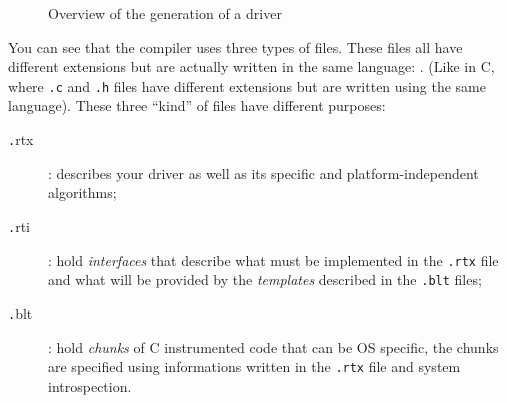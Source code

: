 \documentclass[american]{rtxarticle}
\begin{document}
\begin{figure}[ht!]
\begin{center}
\caption{Overview of the generation of a driver}
\end{center}
\end{figure}

You can see that the compiler uses three types of files. These files all have
different extensions but are actually written in the same language: \rtx. (Like
in C, where \texttt{.c} and \texttt{.h} files have different extensions but are
written using the same language). These three ``kind'' of files have different
purposes:
\begin{description}
\item [{\texttt .rtx}] : describes your driver as well as its specific and
platform-independent algorithms;
\item [{\texttt .rti}] : hold \emph{interfaces} that describe what must be
implemented in the \texttt{.rtx} file and what will be provided by the
\emph{templates} described in the \texttt{.blt} files;
\item [{\texttt .blt}] : hold \emph{chunks} of C instrumented code that can be
OS specific, the chunks are specified using informations written in the
\texttt{.rtx} file and system introspection.
\end{description}
\end{document}
